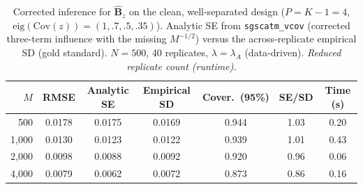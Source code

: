 \begin{table}[t]
\centering
\caption{Corrected inference for $\hat{\mathbf{B}}_z$ on the clean, well-separated design ($P=K-1=4$, $\mathrm{eig}(\mathrm{Cov}(z))=(1,.7,.5,.35)$). Analytic SE from \texttt{sgscatm\_vcov} (corrected three-term influence with the missing $M^{-1/2}$) versus the across-replicate empirical SD (gold standard). $N=500$, 40 replicates, $\lambda=\lambda_A$ (data-driven). \emph{Reduced replicate count (runtime).}}
\label{tab:block1}
\begin{tabular}{rcccccc}
\toprule
$M$ & RMSE & Analytic SE & Empirical SD & Cover.\ (95\%) & SE/SD & Time (s) \\
\midrule
500 & 0.0178 & 0.0175 & 0.0169 & 0.944 & 1.03 & 0.20 \\
1,000 & 0.0130 & 0.0123 & 0.0122 & 0.939 & 1.01 & 0.43 \\
2,000 & 0.0098 & 0.0088 & 0.0092 & 0.920 & 0.96 & 0.06 \\
4,000 & 0.0079 & 0.0062 & 0.0072 & 0.873 & 0.86 & 0.16 \\
\bottomrule
\end{tabular}
\end{table}
